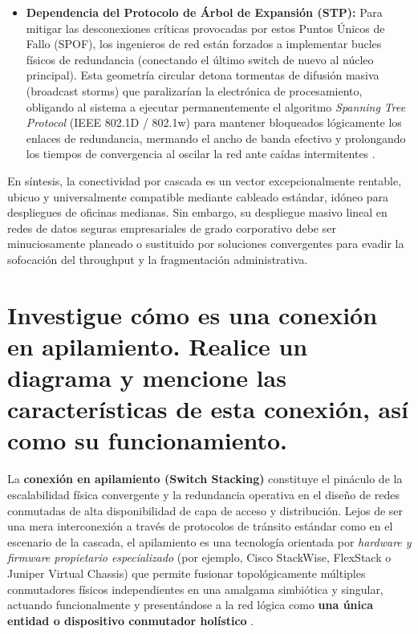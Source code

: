 \documentclass[a4paper,12pt]{article}
\begin{document}
\begin{itemize}
    \item \textbf{Dependencia del Protocolo de Árbol de Expansión (STP):} Para mitigar las desconexiones críticas provocadas por estos Puntos Únicos de Fallo (SPOF), los ingenieros de red están forzados a implementar bucles físicos de redundancia (conectando el último switch de nuevo al núcleo principal). Esta geometría circular detona tormentas de difusión masiva (broadcast storms) que paralizarían la electrónica de procesamiento, obligando al sistema a ejecutar permanentemente el algoritmo \textit{Spanning Tree Protocol} (IEEE 802.1D / 802.1w) para mantener bloqueados lógicamente los enlaces de redundancia, mermando el ancho de banda efectivo y prolongando los tiempos de convergencia al oscilar la red ante caídas intermitentes \cite{ieee8023}.
\end{itemize}

En síntesis, la conectividad por cascada es un vector excepcionalmente rentable, ubicuo y universalmente compatible mediante cableado estándar, idóneo para despliegues de oficinas medianas. Sin embargo, su despliegue masivo lineal en redes de datos seguras empresariales de grado corporativo debe ser minuciosamente planeado o sustituido por soluciones convergentes para evadir la sofocación del throughput y la fragmentación administrativa.

\newpage

\section{Investigue cómo es una conexión en apilamiento. Realice un diagrama y mencione las características de esta conexión, así como su funcionamiento.}

La \textbf{conexión en apilamiento (Switch Stacking)} constituye el pináculo de la escalabilidad física convergente y la redundancia operativa en el diseño de redes conmutadas de alta disponibilidad de capa de acceso y distribución. Lejos de ser una mera interconexión a través de protocolos de tránsito estándar como en el escenario de la cascada, el apilamiento es una tecnología orientada por \textit{hardware y firmware propietario especializado} (por ejemplo, Cisco StackWise, FlexStack o Juniper Virtual Chassis) que permite fusionar topológicamente múltiples conmutadores físicos independientes en una amalgama simbiótica y singular, actuando funcionalmente y presentándose a la red lógica como \textbf{una única entidad o dispositivo conmutador holístico} \cite{stallings2014}.
\end{document}
